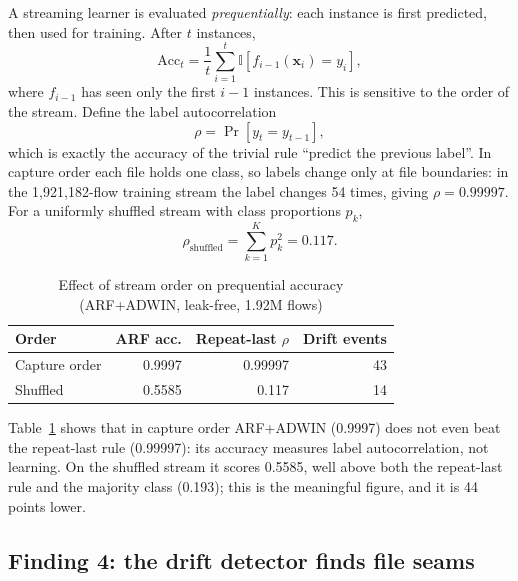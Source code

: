 \documentclass[conference]{IEEEtran}
\begin{document}
A streaming learner is evaluated \emph{prequentially}: each instance is first predicted, then used for training. After $t$ instances,
\begin{equation}
\text{Acc}_t = \frac{1}{t}\sum_{i=1}^{t}\mathbb{I}\!\left[f_{i-1}(\mathbf{x}_i) = y_i\right],
\label{eq:preq}
\end{equation}
where $f_{i-1}$ has seen only the first $i-1$ instances. This is sensitive to the order of the stream. Define the label autocorrelation
\begin{equation}
\rho = \Pr\!\left[y_t = y_{t-1}\right],
\label{eq:rho}
\end{equation}
which is exactly the accuracy of the trivial rule ``predict the previous label''. In capture order each file holds one class, so labels change only at file boundaries: in the 1,921,182-flow training stream the label changes 54 times, giving $\rho = 0.99997$. For a uniformly shuffled stream with class proportions $p_k$,
\begin{equation}
\rho_{\text{shuffled}} = \sum_{k=1}^{K} p_k^{2} = 0.117 .
\label{eq:rhoshuf}
\end{equation}

\begin{table}[!t]
\caption{Effect of stream order on prequential accuracy (ARF+ADWIN, leak-free, 1.92M flows)}
\label{tab:order}
\centering
\footnotesize
\begin{tabular}{@{}lrrr@{}}
\toprule
\textbf{Order} & \textbf{ARF acc.} & \textbf{Repeat-last $\rho$} & \textbf{Drift events} \\
\midrule
Capture order & 0.9997 & 0.99997 & 43 \\
Shuffled & 0.5585 & 0.117 & 14 \\
\bottomrule
\end{tabular}
\end{table}

Table~\ref{tab:order} shows that in capture order ARF+ADWIN (0.9997) does not even beat the repeat-last rule (0.99997): its accuracy measures label autocorrelation, not learning. On the shuffled stream it scores 0.5585, well above both the repeat-last rule and the majority class (0.193); this is the meaningful figure, and it is 44 points lower.

\subsection{Finding 4: the drift detector finds file seams}
\end{document}
